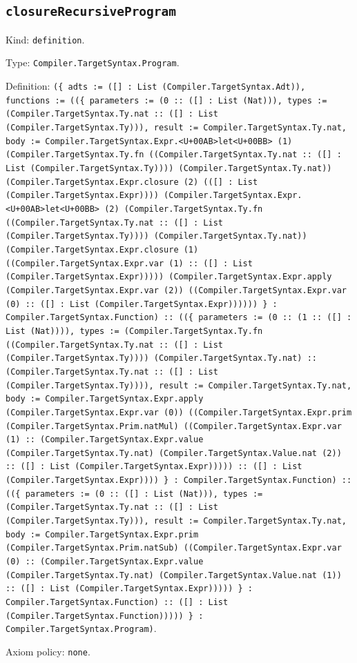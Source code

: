 \documentclass[11pt]{article}
\begin{document}
\subsection*{\texttt{closureRecursiveProgram}}
\noindent Kind: \texttt{definition}.\par
\noindent Type: \texttt{Compiler.TargetSyntax.Program}.\par
\noindent Definition: \texttt{(\{ adts := ([] : List (Compiler.TargetSyntax.Adt)), functions := ((\{ parameters := (0 :: ([] : List (Nat))), types := (Compiler.TargetSyntax.Ty.nat :: ([] : List (Compiler.TargetSyntax.Ty))), result := Compiler.TargetSyntax.Ty.nat, body := Compiler.TargetSyntax.Expr.<U+00AB>let<U+00BB> (1) (Compiler.TargetSyntax.Ty.fn ((Compiler.TargetSyntax.Ty.nat :: ([] : List (Compiler.TargetSyntax.Ty)))) (Compiler.TargetSyntax.Ty.nat)) (Compiler.TargetSyntax.Expr.closure (2) (([] : List (Compiler.TargetSyntax.Expr)))) (Compiler.TargetSyntax.Expr.<U+00AB>let<U+00BB> (2) (Compiler.TargetSyntax.Ty.fn ((Compiler.TargetSyntax.Ty.nat :: ([] : List (Compiler.TargetSyntax.Ty)))) (Compiler.TargetSyntax.Ty.nat)) (Compiler.TargetSyntax.Expr.closure (1) ((Compiler.TargetSyntax.Expr.var (1) :: ([] : List (Compiler.TargetSyntax.Expr))))) (Compiler.TargetSyntax.Expr.apply (Compiler.TargetSyntax.Expr.var (2)) ((Compiler.TargetSyntax.Expr.var (0) :: ([] : List (Compiler.TargetSyntax.Expr)))))) \} : Compiler.TargetSyntax.Function) :: ((\{ parameters := (0 :: (1 :: ([] : List (Nat)))), types := (Compiler.TargetSyntax.Ty.fn ((Compiler.TargetSyntax.Ty.nat :: ([] : List (Compiler.TargetSyntax.Ty)))) (Compiler.TargetSyntax.Ty.nat) :: (Compiler.TargetSyntax.Ty.nat :: ([] : List (Compiler.TargetSyntax.Ty)))), result := Compiler.TargetSyntax.Ty.nat, body := Compiler.TargetSyntax.Expr.apply (Compiler.TargetSyntax.Expr.var (0)) ((Compiler.TargetSyntax.Expr.prim (Compiler.TargetSyntax.Prim.natMul) ((Compiler.TargetSyntax.Expr.var (1) :: (Compiler.TargetSyntax.Expr.value (Compiler.TargetSyntax.Ty.nat) (Compiler.TargetSyntax.Value.nat (2)) :: ([] : List (Compiler.TargetSyntax.Expr))))) :: ([] : List (Compiler.TargetSyntax.Expr)))) \} : Compiler.TargetSyntax.Function) :: ((\{ parameters := (0 :: ([] : List (Nat))), types := (Compiler.TargetSyntax.Ty.nat :: ([] : List (Compiler.TargetSyntax.Ty))), result := Compiler.TargetSyntax.Ty.nat, body := Compiler.TargetSyntax.Expr.prim (Compiler.TargetSyntax.Prim.natSub) ((Compiler.TargetSyntax.Expr.var (0) :: (Compiler.TargetSyntax.Expr.value (Compiler.TargetSyntax.Ty.nat) (Compiler.TargetSyntax.Value.nat (1)) :: ([] : List (Compiler.TargetSyntax.Expr))))) \} : Compiler.TargetSyntax.Function) :: ([] : List (Compiler.TargetSyntax.Function))))) \} : Compiler.TargetSyntax.Program)}.\par
\noindent Axiom policy: \texttt{none}.\par
\end{document}
